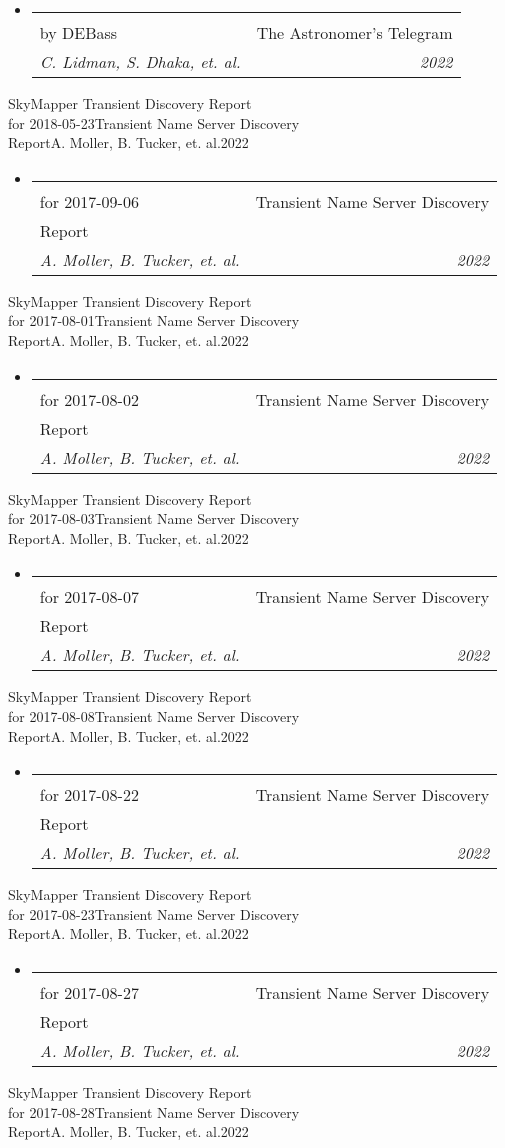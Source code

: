 \documentclass[letterpaper,11pt]{article}
\makeatletter
\newcommand{\resumeItem}[1]{
  \item\small{
    {#1 \vspace{-2pt}}
  }
}
\newcommand{\resumeSubheading}[4]{
  \vspace{-2pt}\item
    \begin{tabular*}{0.97\textwidth}[t]{l@{\extracolsep{\fill}}r}
      \textbf{#1} & #2 \\
      \textit{\small#3} & \textit{\small #4} \\
    \end{tabular*}\vspace{-7pt}
}
\newcommand{\resumeSubHeadingListStart}{\begin{itemize}[leftmargin=0.15in, label={}]}
\newcommand{\resumeSubHeadingListEnd}{\end{itemize}}
\newcommand{\resumeItemListStart}{\begin{itemize}}
\newcommand{\resumeItemListEnd}{\end{itemize}\vspace{-5pt}}
\newcommand{\publicationElement}[5]{%
    \resumeSubHeadingListStart
        \resumeSubheading
            {#1}
            {#2}
            {#3}
            {#4}
            \ifthenelse{\isempty{#5}}{}{%
                \resumeItemListStart
                    \renewcommand*{\do}[1]{\resumeItem{##1}}
                    \docsvlist{#5}%
                \resumeItemListEnd
            }%
    \resumeSubHeadingListEnd
}
\makeatother
\begin{document}
        \publicationElement{Classification of 11 supernovae\\by DEBass}{The Astronomer's Telegram}{C. Lidman, S. Dhaka, et. al.}{2022}
        \publicationElement{SkyMapper Transient Discovery Report\\for 2018-05-23}{Transient Name Server Discovery\\Report}{A. Moller, B. Tucker, et. al.}{2022}
        \publicationElement{SkyMapper Transient Discovery Report\\for 2017-09-06}{Transient Name Server Discovery\\Report}{A. Moller, B. Tucker, et. al.}{2022}
        \publicationElement{SkyMapper Transient Discovery Report\\for 2017-08-01}{Transient Name Server Discovery\\Report}{A. Moller, B. Tucker, et. al.}{2022}
        \publicationElement{SkyMapper Transient Discovery Report\\for 2017-08-02}{Transient Name Server Discovery\\Report}{A. Moller, B. Tucker, et. al.}{2022}
        \publicationElement{SkyMapper Transient Discovery Report\\for 2017-08-03}{Transient Name Server Discovery\\Report}{A. Moller, B. Tucker, et. al.}{2022}
        \publicationElement{SkyMapper Transient Discovery Report\\for 2017-08-07}{Transient Name Server Discovery\\Report}{A. Moller, B. Tucker, et. al.}{2022}
        \publicationElement{SkyMapper Transient Discovery Report\\for 2017-08-08}{Transient Name Server Discovery\\Report}{A. Moller, B. Tucker, et. al.}{2022}
        \publicationElement{SkyMapper Transient Discovery Report\\for 2017-08-22}{Transient Name Server Discovery\\Report}{A. Moller, B. Tucker, et. al.}{2022}
        \publicationElement{SkyMapper Transient Discovery Report\\for 2017-08-23}{Transient Name Server Discovery\\Report}{A. Moller, B. Tucker, et. al.}{2022}
        \publicationElement{SkyMapper Transient Discovery Report\\for 2017-08-27}{Transient Name Server Discovery\\Report}{A. Moller, B. Tucker, et. al.}{2022}
        \publicationElement{SkyMapper Transient Discovery Report\\for 2017-08-28}{Transient Name Server Discovery\\Report}{A. Moller, B. Tucker, et. al.}{2022}
\end{document}

